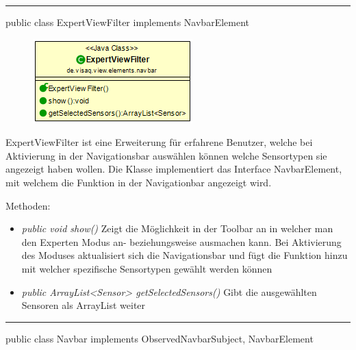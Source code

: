 

\rule{\textwidth}{0.4pt}
public class ExpertViewFilter implements NavbarElement

\begin{minipage}{0.3\textwidth}
    \begin{figure}[H]
        \includegraphics[scale = 0.6]{media/frontend/view/de.view.elements.navbar/ExpertviewFilterClass.png}
    \end{figure}
    \end{minipage} \hfill
    \begin{minipage}{0.6\textwidth}
ExpertViewFilter ist eine Erweiterung für erfahrene Benutzer, welche bei Aktivierung in der Navigationsbar auswählen können welche Sensortypen sie angezeigt haben wollen. Die Klasse implementiert das Interface NavbarElement, mit welchem die Funktion in der Navigationbar angezeigt wird.
\end{minipage}

Methoden:
\begin{itemize}
    \item \emph{public void show()} Zeigt die Möglichkeit in der Toolbar an in welcher man den Experten Modus an- beziehungsweise ausmachen kann. Bei Aktivierung des Moduses aktualisiert sich die Navigationsbar und fügt die Funktion hinzu mit welcher spezifische Sensortypen gewählt werden können
    \item \emph{public ArrayList<Sensor> getSelectedSensors()} Gibt die ausgewählten Sensoren als ArrayList weiter
\end{itemize}
\rule{\textwidth}{0.4pt}
public class Navbar implements ObservedNavbarSubject, NavbarElement

